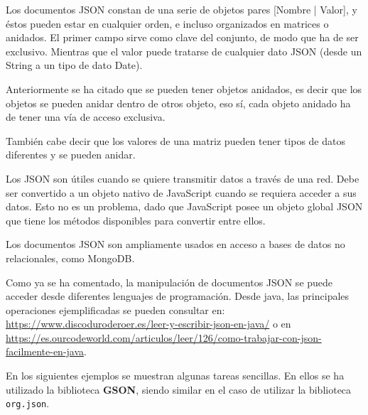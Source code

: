 \documentclass[a4paper,11pt]{scrartcl}
\begin{document}
Los documentos JSON constan de una serie de objetos pares [Nombre | Valor], y éstos pueden estar en cualquier orden, e incluso organizados en matrices o anidados. El primer campo sirve como clave del conjunto, de modo que ha de ser exclusivo. Mientras que el valor puede tratarse de cualquier dato JSON (desde un String a un tipo de dato Date).

Anteriormente se ha citado que se pueden tener objetos anidados, es decir que los objetos se pueden anidar dentro de otros objeto, eso sí, cada objeto anidado ha de tener una vía de acceso exclusiva. 

También cabe decir que los valores de una matriz pueden tener tipos de datos diferentes y se pueden anidar.

Los JSON son útiles cuando se quiere transmitir datos a través de una red. Debe ser convertido a un objeto nativo de JavaScript cuando se requiera acceder a sus datos. Esto no es un problema, dado que JavaScript posee un objeto global JSON que tiene los métodos disponibles para convertir entre ellos.

Los documentos JSON son ampliamente usados en acceso a bases de datos no relacionales, como MongoDB. 

Como ya se ha comentado, la manipulación de documentos JSON se puede acceder desde diferentes lenguajes de programación. Desde java, las principales operaciones ejemplificadas se pueden consultar en: \url{https://www.discoduroderoer.es/leer-y-escribir-json-en-java/} o en \url{https://es.ourcodeworld.com/articulos/leer/126/como-trabajar-con-json-facilmente-en-java}.  

En los siguientes ejemplos se muestran algunas tareas sencillas. En ellos se ha utilizado la biblioteca \textbf{GSON}, siendo similar en el caso de utilizar la biblioteca \texttt{org.json}. 
\end{document}
